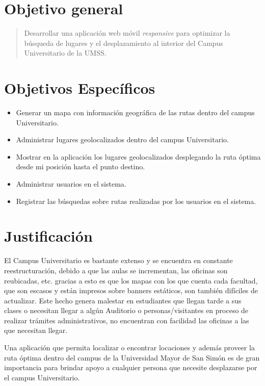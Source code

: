   \section{Objetivo general} %
  \label{sec:objetivo_general}
    \begin{quote}
      Desarrollar una aplicación web móvil \emph{responsive} para optimizar la búsqueda de lugares y el  desplazamiento al interior del Campus Universitario de la UMSS.
    \end{quote}


  \section{Objetivos Específicos} %
  \label{sec:obj_especificos}
    \begin{itemize}
      \item Generar un mapa con información geográfica de las rutas dentro del campus Universitario.
      \item Administrar lugares geolocalizados dentro del campus Universitario.
      \item Mostrar en la aplicación los lugares geolocalizados desplegando la ruta óptima desde mi posición hasta el punto destino.
      \item Administrar usuarios en el sistema.
      \item Registrar las búsquedas sobre rutas realizadas por los usuarios en el sistema.
    \end{itemize}


  \section{Justificación} %
  \label{sec:justificacion}

  El Campus Universitario es bastante extenso y se encuentra en constante reestructuración, debido a que las aulas se incrementan, las oficinas son reubicadas, etc. gracias a esto es que los mapas con los que cuenta cada facultad, que son escasos y están impresos sobre banners estáticos, son también difíciles de actualizar. Este hecho genera malestar en estudiantes que llegan tarde a sus clases o necesitan llegar a algún Auditorio o personas/visitantes en proceso de realizar trámites administrativos, no encuentran con facilidad las oficinas a las que necesitan llegar.

  Una aplicación que permita localizar o encontrar locaciones y además proveer la ruta óptima dentro del campus de la Universidad Mayor de San Simón es de gran importancia para brindar apoyo a cualquier persona que necesite desplazarse por el campus Universitario.


